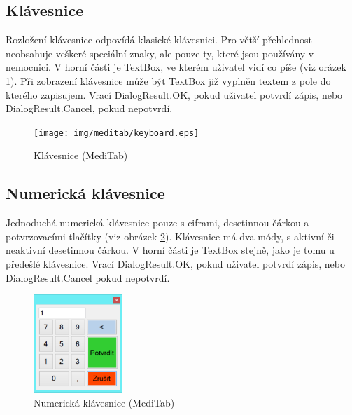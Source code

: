 \subsection{Klávesnice}

Rozložení klávesnice odpovídá klasické klávesnici. Pro větší přehlednost neobsahuje veškeré speciální znaky, ale pouze ty, které jsou používány v nemocnici. V horní části je TextBox, ve kterém uživatel vidí co píše (viz orázek \ref{fig:keyboard}). Při zobrazení klávesnice může být TextBox již vyplněn textem z pole do kterého zapisujem. Vrací DialogResult.OK, pokud uživatel potvrdí zápis, nebo DialogResult.Cancel, pokud nepotvrdí.

\begin{figure}[H]
	\centering
	\texttt{[image: img/meditab/keyboard.eps]}
	\caption{Klávesnice (MediTab)}
  \label{fig:keyboard}
\end{figure}

\subsection{Numerická klávesnice}

Jednoduchá numerická klávesnice pouze s ciframi, desetinnou čárkou a potvrzovacími tlačítky (viz obrázek \ref{fig:keyboard_num}). Klávesnice má dva módy, s aktivní či neaktivní desetinnou čárkou. V horní části je TextBox stejně, jako je tomu u předešlé klávesnice. Vrací DialogResult.OK, pokud uživatel potvrdí zápis, nebo DialogResult.Cancel pokud nepotvrdí.

\begin{figure}[H]
	\centering
	\includegraphics[width=0.3\textwidth]{img/meditab/keyboard_numeric.eps}
	\caption{Numerická klávesnice (MediTab)}
  \label{fig:keyboard_num}
\end{figure}